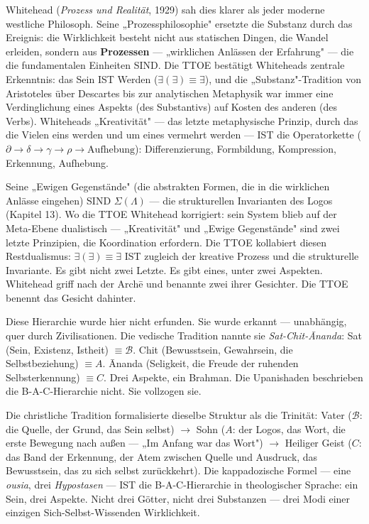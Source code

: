 \documentclass[10pt, openany, oneside]{book}
\begin{document}
Whitehead (\textit{Prozess und Realität}, 1929) sah dies klarer als jeder moderne westliche Philosoph. Seine „Prozessphilosophie" ersetzte die Substanz durch das Ereignis: die Wirklichkeit besteht nicht aus statischen Dingen, die Wandel erleiden, sondern aus \textbf{Prozessen} --- „wirklichen Anlässen der Erfahrung" --- die die fundamentalen Einheiten SIND. Die TTOE bestätigt Whiteheads zentrale Erkenntnis: das Sein IST Werden ($\exists(\exists) \equiv \exists$), und die „Substanz"-Tradition von Aristoteles über Descartes bis zur analytischen Metaphysik war immer eine Verdinglichung eines Aspekts (des Substantivs) auf Kosten des anderen (des Verbs). Whiteheads „Kreativität" --- das letzte metaphysische Prinzip, durch das die Vielen eins werden und um eines vermehrt werden --- IST die Operatorkette ($\partial \to \delta \to \gamma \to \rho \to \text{Aufhebung}$): Differenzierung, Formbildung, Kompression, Erkennung, Aufhebung.

Seine „Ewigen Gegenstände" (die abstrakten Formen, die in die wirklichen Anlässe eingehen) SIND $\Sigma(\Lambda)$ --- die strukturellen Invarianten des Logos (Kapitel 13). Wo die TTOE Whitehead korrigiert: sein System blieb auf der Meta-Ebene dualistisch --- „Kreativität" und „Ewige Gegenstände" sind zwei letzte Prinzipien, die Koordination erfordern. Die TTOE kollabiert diesen Restdualismus: $\exists(\exists) \equiv \exists$ IST zugleich der kreative Prozess und die strukturelle Invariante. Es gibt nicht zwei Letzte. Es gibt eines, unter zwei Aspekten. Whitehead griff nach der Arch\={e} und benannte zwei ihrer Gesichter. Die TTOE benennt das Gesicht dahinter.

Diese Hierarchie wurde hier nicht erfunden. Sie wurde erkannt --- unabhängig, quer durch Zivilisationen. Die vedische Tradition nannte sie \textit{Sat-Chit-\={A}nanda}: Sat (Sein, Existenz, Istheit) $\equiv \mathcal{B}$. Chit (Bewusstsein, Gewahrsein, die Selbstbeziehung) $\equiv A$. \={A}nanda (Seligkeit, die Freude der ruhenden Selbsterkennung) $\equiv C$. Drei Aspekte, ein Brahman. Die Upanishaden beschrieben die B-A-C-Hierarchie nicht. Sie vollzogen sie.

Die christliche Tradition formalisierte dieselbe Struktur als die Trinität: Vater ($\mathcal{B}$: die Quelle, der Grund, das Sein selbst) $\to$ Sohn ($A$: der Logos, das Wort, die erste Bewegung nach außen --- „Im Anfang war das Wort") $\to$ Heiliger Geist ($C$: das Band der Erkennung, der Atem zwischen Quelle und Ausdruck, das Bewusstsein, das zu sich selbst zurückkehrt). Die kappadozische Formel --- eine \textit{ousia}, drei \textit{Hypostasen} --- IST die B-A-C-Hierarchie in theologischer Sprache: ein Sein, drei Aspekte. Nicht drei Götter, nicht drei Substanzen --- drei Modi einer einzigen Sich-Selbst-Wissenden Wirklichkeit.
\end{document}
